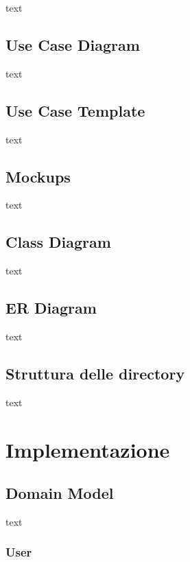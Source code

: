 \documentclass[11pt]{article}
\begin{document}
        text

        \subsection{Use Case Diagram} \label{subsec:use-case-diagram}

            text

        \subsection{Use Case Template} \label{subsec:use-case-template}

            text

        \subsection{Mockups} \label{subsec:mockups}

            text

        \subsection{Class Diagram} \label{subsec:class-diagram}

            text

        \subsection{ER Diagram} \label{subsec:er-diagram}

            text

        \subsection{Struttura delle directory} \label{subsec:struttura-delle-directory}

            text

    \section{Implementazione} \label{sec:implementazione}

        \subsection{Domain Model} \label{subsec:domain-model}

            text

            \subsubsection{User} \label{subsubsec:user}
\end{document}
